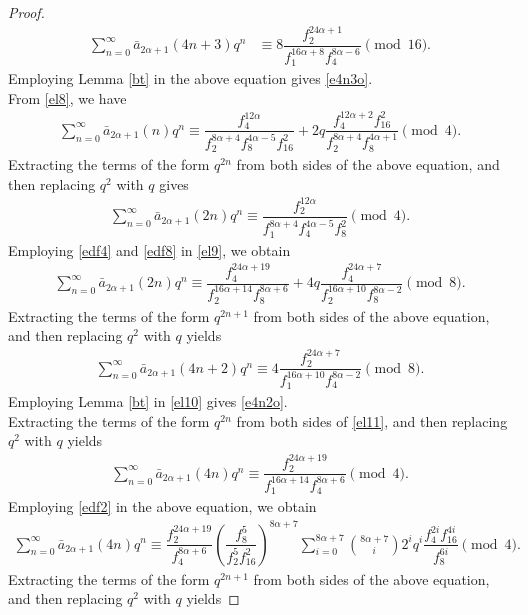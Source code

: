 \documentclass[11pt,a4paper]{article}
\numberwithin{equation}{section}
\theoremstyle{plain}
\begin{document}
\begin{proof}
\begin{align}
	\sum_{n=0}^{\infty}\bar{a}_{2\alpha+1}(4n+3)q^n&\equiv8\dfrac{f_2^{24\alpha+1}}{f_1^{16\alpha+8}f_4^{8\alpha-6}} \pmod{16}.
	\end{align}
	Employing Lemma \ref{bt} in the above equation gives \eqref{e4n3o}.\\
\indent From \eqref{el8}, we have
\begin{align*}
\sum_{n=0}^{\infty}\bar{a}_{2\alpha+1}(n)q^n\equiv\dfrac{f_4^{12\alpha}}{f_2^{8\alpha+4}f_8^{4\alpha-5}f_{16}^2}+2q\dfrac{f_4^{12\alpha+2}f_{16}^2}{f_2^{8\alpha+4}f_8^{4\alpha+1}}\pmod 4.
\end{align*}
Extracting the terms of the form $q^{2n}$ from both sides of the above equation, and then replacing $q^{2}$ with $q$ gives
\begin{align}\label{el9}
\sum_{n=0}^{\infty}\bar{a}_{2\alpha+1}(2n)q^n\equiv\dfrac{f_2^{12\alpha}}{f_1^{8\alpha+4}f_4^{4\alpha-5}f_{8}^2}\pmod 4.
\end{align}
Employing \eqref{edf4} and \eqref{edf8} in \eqref{el9}, we obtain
\begin{align}\label{el11}
\sum_{n=0}^{\infty}\bar{a}_{2\alpha+1}(2n)q^n\equiv\dfrac{f_4^{24\alpha+19}}{f_2^{16\alpha+14}f_8^{8\alpha+6}}+4q\dfrac{f_4^{24\alpha+7}}{f_2^{16\alpha+10}f_8^{8\alpha-2}}\pmod 8.
\end{align}
Extracting the terms of the form $q^{2n+1}$ from both sides of the above equation, and then replacing $q^{2}$ with $q$ yields
	\begin{align}\label{el10}
	\sum_{n=0}^{\infty}\bar{a}_{2\alpha+1}(4n+2)q^n\equiv4\dfrac{f_2^{24\alpha+7}}{f_1^{16\alpha+10}f_4^{8\alpha-2}}\pmod 8.
	\end{align}
	Employing Lemma \ref{bt} in \eqref{el10} gives \eqref{e4n2o}.\\
	\indent	Extracting the terms of the form $q^{2n}$ from both sides of \eqref{el11}, and then replacing $q^{2}$ with $q$ yields 
		\begin{align*}
		\sum_{n=0}^{\infty}\bar{a}_{2\alpha+1}(4n)q^n\equiv\dfrac{f_2^{24\alpha+19}}{f_1^{16\alpha+14}f_4^{8\alpha+6}}\pmod 4.
		\end{align*}
			Employing \eqref{edf2} in the above equation, we obtain
		\begin{align*}
			\sum_{n=0}^{\infty}\bar{a}_{2\alpha+1}(4n)q^n\equiv\dfrac{f_2^{24\alpha+19}}{f_4^{8\alpha+6}}\left(\dfrac{f_8^5}{f_2^5f_{16}^2}\right)^{8\alpha+7}\sum_{i=0}^{8\alpha+7}\binom{8\alpha+7}{i}2^iq^i\dfrac{f_4^{2i}f_{16}^{4i}}{f_8^{6i}}\pmod 4.
		\end{align*}
		Extracting the terms of the form $q^{2n+1}$ from both sides of the above equation, and then replacing $q^{2}$ with $q$ yields

\end{proof}
\end{document}
